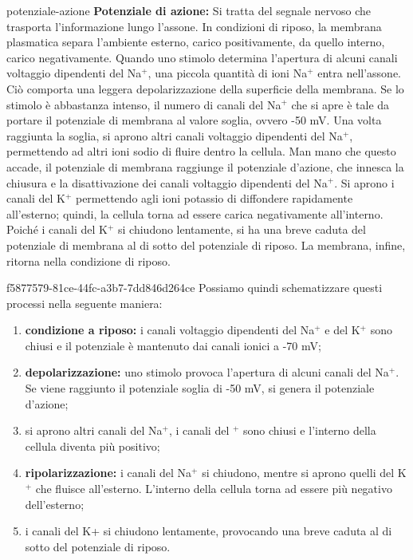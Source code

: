 \documentclass[preview]{standalone}
\begin{document}
\begin{snippet}{potenziale-azione}
    \textbf{Potenziale di azione:} Si tratta del segnale nervoso che trasporta l'informazione lungo l'assone.
In condizioni di riposo, la membrana plasmatica separa l'ambiente esterno, carico positivamente, da quello
interno, carico negativamente. Quando uno stimolo determina l'apertura di alcuni canali
voltaggio dipendenti del Na\({}^+\), una piccola quantità di ioni Na\({}^+\) entra nell'assone. Ciò
comporta una leggera depolarizzazione della superficie della membrana. Se lo stimolo è
abbastanza intenso, il numero di canali del Na\({}^+\) che si apre è tale da portare il potenziale di
membrana al valore soglia, ovvero -50 mV. Una volta raggiunta la soglia, si aprono altri
canali voltaggio dipendenti del Na\({}^+\), permettendo ad altri ioni sodio di fluire dentro la cellula.
Man mano che questo accade, il potenziale di membrana raggiunge il potenziale d'azione,
che innesca la chiusura e la disattivazione dei canali voltaggio dipendenti del Na\({}^+\). Si aprono
i canali del K\({}^+\) permettendo agli ioni potassio di diffondere rapidamente all'esterno; quindi,
la cellula torna ad essere carica negativamente all'interno. Poiché i canali del K\({}^+\) si chiudono
lentamente, si ha una breve caduta del potenziale di membrana al di sotto del potenziale di
riposo. La membrana, infine, ritorna nella condizione di riposo.
\end{snippet}

\begin{snippet}{f5877579-81ce-44fc-a3b7-7dd846d264ce}
    Possiamo quindi schematizzare questi processi nella seguente maniera:
    \begin{enumerate}
        \item \textbf{condizione a riposo:} i canali voltaggio dipendenti del Na\({}^+\) e del K\({}^+\) sono chiusi e il potenziale
            è mantenuto dai canali ionici a -70 mV;
        \item \textbf{depolarizzazione:} uno stimolo provoca l'apertura di alcuni canali del Na\({}^+\). Se viene raggiunto
            il potenziale soglia di -50 mV, si genera il potenziale d'azione;
        \item si aprono altri canali del Na\({}^+\), i canali del \({}^+\) sono chiusi e l'interno della cellula diventa più
            positivo;
        \item \textbf{ripolarizzazione:} i canali del Na\({}^+\) si chiudono, mentre si aprono quelli del K\({}^+\) che fluisce
            all'esterno. L'interno della cellula torna ad essere più negativo dell'esterno;
        \item i canali del K+ si chiudono lentamente, provocando una breve caduta al di sotto del
            potenziale di riposo.
    \end{enumerate}
\end{snippet}
\end{document}
